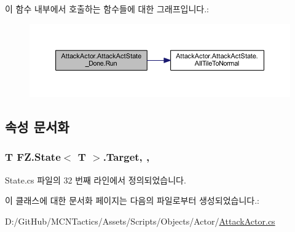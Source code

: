 이 함수 내부에서 호출하는 함수들에 대한 그래프입니다.\+:
\nopagebreak
\begin{figure}[H]
\begin{center}
\leavevmode
\includegraphics[width=350pt]{class_attack_actor_1_1_attack_act_state___done_a87dc9fe06b7132e7eff68fce885c2cd2_cgraph}
\end{center}
\end{figure}




\subsection{속성 문서화}
\subsubsection[{\texorpdfstring{Target}{Target}}]{\setlength{\rightskip}{0pt plus 5cm}T {\bf F\+Z.\+State}$<$ T $>$.Target\hspace{0.3cm}{\ttfamily [get]}, {\ttfamily [protected]}, {\ttfamily [inherited]}}\hypertarget{class_f_z_1_1_state_a6927f5c9f2517052f9dc5596188e9d95}{}\label{class_f_z_1_1_state_a6927f5c9f2517052f9dc5596188e9d95}


State.\+cs 파일의 32 번째 라인에서 정의되었습니다.



이 클래스에 대한 문서화 페이지는 다음의 파일로부터 생성되었습니다.\+:\begin{DoxyCompactItemize}
\item 
D\+:/\+Git\+Hub/\+M\+C\+N\+Tactics/\+Assets/\+Scripts/\+Objects/\+Actor/\hyperlink{_attack_actor_8cs}{Attack\+Actor.\+cs}\end{DoxyCompactItemize}
